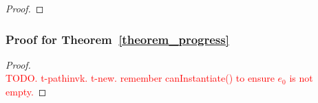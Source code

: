 \begin{proof}
\begin{comment}
\noindent \textbf{Case PathInvk.}
let \[ e = \angl{J}\new I.K::m(\overline{\angl{I_e}} \overline{e}) \]  
Suppose \[ \mbody(m, I, K) = (J', \overline{I_x} \; \overline{x}, I_{e_0} \; e_0) \] 
then \[ e' =  [\overline{\angl{I_x}} \overline{e}/\overline{x}, \; \angl{K}\new I/\kwthis ] e_0 \] 
By rules \textsc{(T-New)} and \textsc{(T-Invk)}, 
  \[ \judgeewf \Gamma {\new I:I} \quad 
     \mtype(m, I, K) = \overline{I_x} \rightarrow I_{e_0} \quad 
     \judgeewf \Gamma {\overline{e} : \overline{I_e'}} \quad
     \overline{I_e'} \subtype \overline{I_x} \quad
     \textit{, for some } \; \overline{I_e'}
  \]
By Lemma~\ref{lemma0},
    \[
    \judgeewf {\Gamma, \overline{x}:\overline{I_x}, \kwthis:J_0} {e_0:I_f} \textit{, for some } K \subtype J_0 \textit{ and } I_f \subtype I_{e_0}
    \]
By Lemma~\ref{lemma1},
    \[
    \judgeewf {\Gamma} {[\overline{\angl{I_x}} \overline{e}/\overline{x}, \; \angl{K}\new I/\kwthis ] e_0  :  I_g} \textit{, for some } I_g \subtype I_f 
    \]
So $I_g <: I_{e_0}$, finally just let $I' = I_g$.

\noindent \textbf{Case Super-Invk.}
let \[ e = \kwsuper.K::m(\overline{\angl{I_e}} \overline{e}) \]   
Suppose \[ \mbody(m, K, K) = (J', \overline{I_x} \; \overline{x}, I_{e_0} \; e_0) \] 
then \[ e' =  [\overline{\angl{I_x}} \overline{e}/\overline{x}] e_0 \] 
By rules \textsc{(T-New)} and \textsc{(T-Invk)}, 
  \[ 
     \mtype(m, K, K) = \overline{I_x} \rightarrow I_{e_0} \quad 
     \judgeewf \Gamma {\overline{e} : \overline{I_e'}} \quad
     \overline{I_e'} \subtype \overline{I_x} \quad
     \textit{, for some } \; \overline{I_e'}
  \]
By Lemma~\ref{lemma0},
    \[
    \judgeewf {\Gamma, \overline{x}:\overline{I_x}, \kwthis:J_0} {e_0:I_f} \textit{, for some } K \subtype J_0 \textit{ and } I_f \subtype I_{e_0}
    \]
By Lemma~\ref{lemma1},
    \[
    \judgeewf {\Gamma} {[\overline{\angl{I_x}} \overline{e}/\overline{x} ] e_0  :  I_g} \textit{, for some } I_g \subtype I_f 
    \]
So $I_g <: I_{e_0}$, finally just let $I' = I_g$.

\end{comment}
\end{proof}

\subsubsection{Proof for Theorem~\ref{theorem_progress}}
\begin{proof}~\\
\noindent \textcolor{red}{TODO. t-pathinvk. t-new. remember canInstantiate() to ensure $e_0$ is not empty.}
\end{proof}